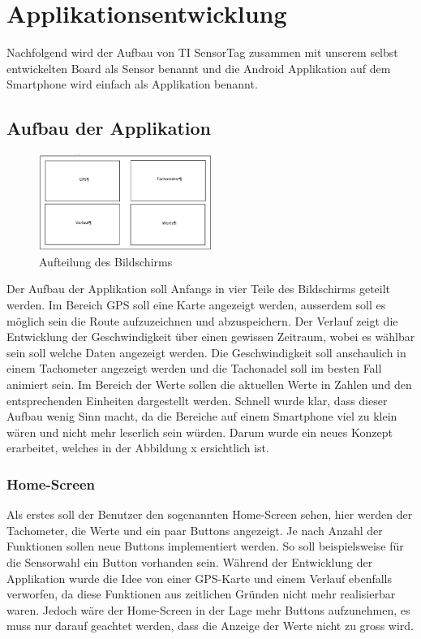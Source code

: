\section{Applikationsentwicklung}
Nachfolgend wird der Aufbau von TI SensorTag zusammen mit unserem selbst entwickelten Board als Sensor benannt und die Android Applikation auf dem Smartphone wird einfach als Applikation benannt.

\subsection{Aufbau der Applikation}
\begin{figure}[ht]
    \includegraphics[width=0.5\textwidth]{3Vorgehen/imag/Aufbau_Applikation_erste_Version.PNG}
    \caption{Aufteilung des Bildschirms}\label{aufbau_applikation_1} 
\end{figure}

Der Aufbau der Applikation soll Anfangs in vier Teile des Bildschirms geteilt werden. 
Im Bereich GPS soll eine Karte angezeigt werden, ausserdem soll es möglich sein die Route aufzuzeichnen und abzuspeichern.
Der Verlauf zeigt die Entwicklung der Geschwindigkeit über einen gewissen Zeitraum, wobei es wählbar sein soll welche Daten angezeigt werden.
Die Geschwindigkeit soll anschaulich in einem Tachometer angezeigt werden und die Tachonadel soll im besten Fall animiert sein.
Im Bereich der Werte sollen die aktuellen Werte in Zahlen und den entsprechenden Einheiten dargestellt werden.
Schnell wurde klar, dass dieser Aufbau wenig Sinn macht, da die Bereiche auf einem Smartphone viel zu klein wären und nicht mehr leserlich sein würden. Darum wurde ein neues Konzept erarbeitet, welches in der Abbildung x ersichtlich ist.

\subsubsection{Home-Screen}

Als erstes soll der Benutzer den sogenannten Home-Screen sehen, hier werden der Tachometer, die Werte und ein paar Buttons angezeigt. Je nach Anzahl der Funktionen sollen neue Buttons implementiert werden. So soll beispielsweise für die Sensorwahl ein Button vorhanden sein. Während der Entwicklung der Applikation wurde die Idee von einer GPS-Karte und einem Verlauf ebenfalls verworfen, da diese Funktionen aus zeitlichen Gründen nicht mehr realisierbar waren. Jedoch wäre der Home-Screen in der Lage mehr Buttons aufzunehmen, es muss nur darauf geachtet werden, dass die Anzeige der Werte nicht zu gross wird.

